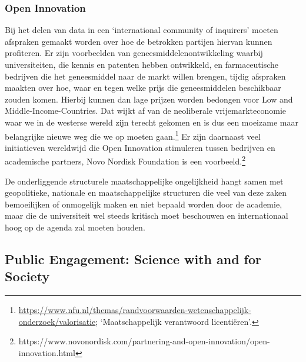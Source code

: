 \documentclass{jote-book}
\begin{document}
	\subsubsection{Open Innovation}



	Bij het delen van data in een ‘international community of inquirers' moeten afspraken gemaakt worden over hoe de betrokken partijen hiervan kunnen profiteren. Er zijn voorbeelden van geneesmiddelenontwikkeling waarbij universiteiten, die kennis en patenten hebben ontwikkeld, en farmaceutische bedrijven die het geneesmiddel naar de markt willen brengen, tijdig afspraken maakten over hoe, waar en tegen welke prijs die geneesmiddelen beschikbaar zouden komen. Hierbij kunnen dan lage prijzen worden bedongen voor Low and Middle-Income-Countries. Dat wijkt af van de neoliberale vrijemarkteconomie waar we in de westerse wereld zijn terecht gekomen en is dus een moeizame maar belangrijke nieuwe weg die we op moeten gaan.\footnote{\href{https://www.nfu.nl/themas/randvoorwaarden-wetenschappelijk-onderzoek/valorisatie}{https://www.nfu.nl/themas/randvoorwaarden-wetenschappelijk-onderzoek/valorisatie}; ‘Maatschappelijk verantwoord licentiëren'.} Er zijn daarnaast veel initiatieven wereldwijd die Open Innovation stimuleren tussen bedrijven en academische partners, Novo Nordisk Foundation is een voorbeeld.\footnote{https://www.novonordisk.com/partnering-and-open-innovation/open-innovation.html}



	De onderliggende structurele maatschappelijke ongelijkheid hangt samen met geopolitieke, nationale en maatschappelijke structuren die veel van deze zaken bemoeilijken of onmogelijk maken en niet bepaald worden door de academie, maar die de universiteit wel steeds kritisch moet beschouwen en internationaal hoog op de agenda zal moeten houden.



	\subsection{Public Engagement: Science with and for Society }
\end{document}
